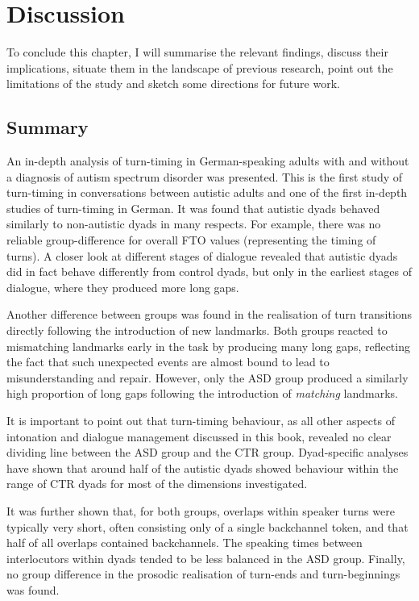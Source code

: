 \section{Discussion}\label{sec:turntaking_conclusion}

To conclude this chapter, I will summarise the relevant findings, discuss their implications, situate them in the landscape of previous research, point out the limitations of the study and sketch some directions for future work.

\subsection{Summary}\label{turntaking_conclusion_summary}

An in-depth analysis of turn-timing in German-speaking adults with and without a diagnosis of autism spectrum disorder was presented. This is the first study of turn-timing in conversations between autistic adults and one of the first in-depth studies of turn-timing in German. It was found that autistic dyads behaved similarly to non-autistic dyads in many respects. For example, there was no reliable group-difference for overall FTO values (representing the timing of turns). A closer look at different stages of dialogue revealed that autistic dyads did in fact behave differently from control dyads, but only in the earliest stages of dialogue, where they produced more long gaps.

Another difference between groups was found in the realisation of turn transitions directly following the introduction of new landmarks. Both groups reacted to mismatching landmarks early in the task by producing many long gaps, reflecting the fact that such unexpected events are almost bound to lead to misunderstanding and repair. However, only the ASD group produced a similarly high proportion of long gaps following the introduction of \emph{matching} landmarks.

It is important to point out that turn-timing behaviour, as all other aspects of intonation and dialogue management discussed in this book, revealed no clear dividing line between the ASD group and the CTR group. Dyad-specific analyses have shown that around half of the autistic dyads showed behaviour within the range of CTR dyads for most of the dimensions investigated.

It was further shown that, for both groups, overlaps within speaker turns were typically very short, often consisting only of a single backchannel token, and that half of all overlaps contained backchannels. The speaking times between interlocutors within dyads tended to be less balanced in the ASD group. Finally, no group difference in the prosodic realisation of turn-ends and turn-beginnings was found.

